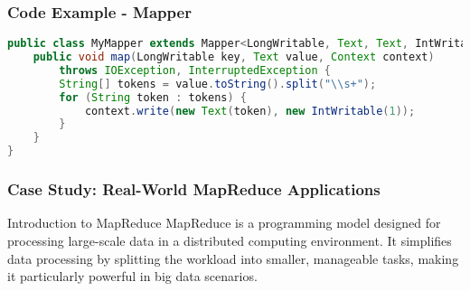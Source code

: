 \documentclass[aspectratio=169]{beamer}
\begin{document}
\begin{frame}[fragile]
    \frametitle{Code Example - Mapper}
    \begin{lstlisting}[language=Java]
public class MyMapper extends Mapper<LongWritable, Text, Text, IntWritable> {
    public void map(LongWritable key, Text value, Context context) 
        throws IOException, InterruptedException {
        String[] tokens = value.toString().split("\\s+");
        for (String token : tokens) {
            context.write(new Text(token), new IntWritable(1));
        }
    }
}
    \end{lstlisting}
\end{frame}

\begin{frame}[fragile]
    \frametitle{Case Study: Real-World MapReduce Applications}
    \begin{block}{Introduction to MapReduce}
        MapReduce is a programming model designed for processing large-scale data in a distributed computing environment. It simplifies data processing by splitting the workload into smaller, manageable tasks, making it particularly powerful in big data scenarios.
    \end{block}
\end{frame}
\end{document}
